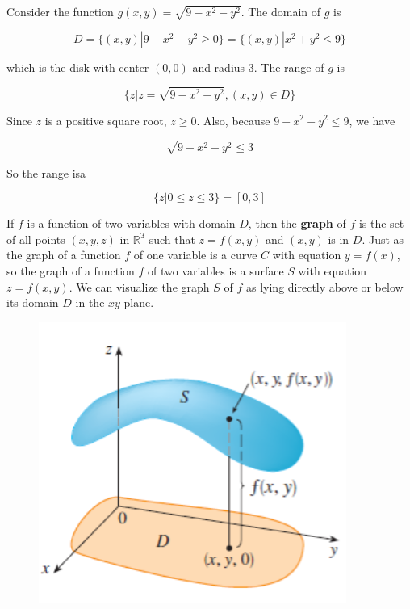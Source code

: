         \textit{} Consider the function $g(x,y)=\sqrt{9-x^2-y^2}$. The domain of $g$ is

        \[
            D = \{(x,y) | 9-x^2 - y^2 \geq 0\} = \{(x,y) | x^2 + y^2 \leq 9 \}
        \]

        which is the disk with center $(0,0)$ and radius 3. The range of $g$ is

        \[
            \{z| z = \sqrt{9-x^2 - y^2}, (x,y) \in D\}
        \]

        Since $z$ is a positive square root, $z\geq 0$. Also, because $9-x^2 - y^2 \leq 9$, we have

        \[
            \sqrt{9-x^2 - y^2 } \leq 3
        \]

        So the range isa

        \[
            \{z| 0 \leq z \leq 3\} = [0,3]
        \]

        If $f$ is a function of two variables with domain $D$, then the \textbf{graph} of $f$ is the set of all points $(x,y,z)$ in $\mathbb{R^3}$ such that $z=f(x,y)$ and $(x,y)$ is in $D$. Just as the graph of a
        function $f$ of one variable is a curve $C$ with equation $y=f(x)$, so the graph of a function $f$ of two variables is a surface $S$ with equation $z=f(x,y)$. We can visualize the graph $S$ of $f$ as
        lying directly above or below its domain $D$ in the $xy$-plane.

        \begin{figure}[hbt!]
            \centering
            \includegraphics[scale = 0.75]{Resources/14.1_Surface}
        \end{figure}

